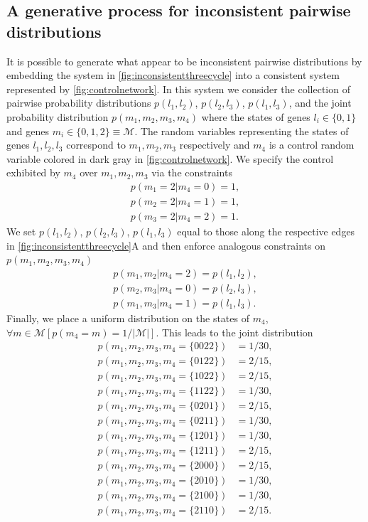 \subsection{A generative process for inconsistent pairwise distributions}
It is possible to generate what appear to be inconsistent pairwise distributions by embedding the system in \ref{fig:inconsistentthreecycle} into a consistent system represented by \ref{fig:controlnetwork}. In this system we consider the collection of pairwise probability distributions $p(l_1,l_2)$, $p(l_2,l_3)$, $p(l_1,l_3)$, and the joint probability distribution $p(m_1,m_2,m_3,m_4)$ where the states of genes $l_i \in \{ 0, 1\}$ and genes $m_i \in \{0,1,2\} \equiv \mathcal{M}$. The random variables representing the states of genes $l_1,l_2,l_3$ correspond to $m_1,m_2,m_3$ respectively and $m_4$ is a control random variable colored in dark gray in \ref{fig:controlnetwork}. We specify the control exhibited by $m_4$ over $m_1,m_2,m_3$ via the constraints
\begin{align*}
p(m_1=2|m_4=0)=1,\\
p(m_2=2|m_4=1)=1,\\
p(m_3=2|m_4=2)=1.
\end{align*}
We set $p(l_1,l_2)$, $p(l_2,l_3)$, $p(l_1,l_3)$ equal to those along the respective edges in \ref{fig:inconsistentthreecycle}A and then enforce analogous constraints on $p(m_1,m_2,m_3,m_4)$
\begin{align*}
p(m_1,m_2|m_4=2)=p(l_1,l_2),\\
p(m_2,m_3|m_4=0)=p(l_2,l_3),\\
p(m_1,m_3|m_4=1)=p(l_1,l_3).
\end{align*}
Finally, we place a uniform distribution on the states of $m_4$, $\forall m \in \mathcal{M} \left[ p(m_4=m) = 1/|\mathcal{M}| \right]$. This leads to the joint distribution
\begin{align*}
p(m_1,m_2,m_3,m_4=\{0022\})&=1/30,\\
p(m_1,m_2,m_3,m_4=\{0122\})&=2/15,\\
p(m_1,m_2,m_3,m_4=\{1022\})&=2/15,\\
p(m_1,m_2,m_3,m_4=\{1122\})&=1/30,\\
p(m_1,m_2,m_3,m_4=\{0201\})&=2/15,\\
p(m_1,m_2,m_3,m_4=\{0211\})&=1/30,\\
p(m_1,m_2,m_3,m_4=\{1201\})&=1/30,\\
p(m_1,m_2,m_3,m_4=\{1211\})&=2/15,\\
p(m_1,m_2,m_3,m_4=\{2000\})&=2/15,\\
p(m_1,m_2,m_3,m_4=\{2010\})&=1/30,\\
p(m_1,m_2,m_3,m_4=\{2100\})&=1/30,\\
p(m_1,m_2,m_3,m_4=\{2110\})&=2/15.
\end{align*}
